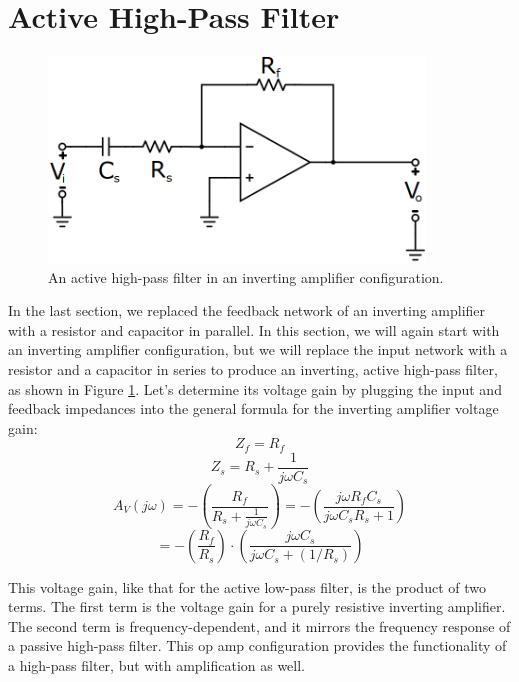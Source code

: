 \section{Active High-Pass Filter}
\begin{figure}[h!]
\centering
\includegraphics[width=10cm]{figures/activeHP.png}
\caption{An active high-pass filter in an inverting amplifier configuration.}
\label{activeHP}
\end{figure}
In the last section, we replaced the feedback network of an inverting amplifier with a resistor and capacitor in parallel. In this section, we will again start with an inverting amplifier configuration, but we will replace the input network with a resistor and a capacitor in series to produce an inverting, active high-pass filter, as shown in Figure \ref{activeHP}. Let's determine its voltage gain by plugging the input and feedback impedances into the general formula for the inverting amplifier voltage gain:
$$
Z_f = R_f
$$
$$
Z_s = R_s + \frac{1}{j\omega C_s}
$$
$$
A_V(j\omega) = -\left(\frac{R_f}{R_s + \frac{1}{j\omega C_s}}\right) = -\left(\frac{j\omega R_fC_s}{j\omega C_sR_s+1}\right) 
$$
$$
= -\left(\frac{R_f}{R_s}\right)\cdot\left(\frac{j\omega C_s}{j\omega C_s+(1/R_s)}\right)
$$
\par
This voltage gain, like that for the active low-pass filter, is the product of two terms. The first term is the voltage gain for a purely resistive inverting amplifier. The second term is frequency-dependent, and it mirrors the frequency response of a passive high-pass filter. This op amp configuration provides the functionality of a high-pass filter, but with amplification as well. 
